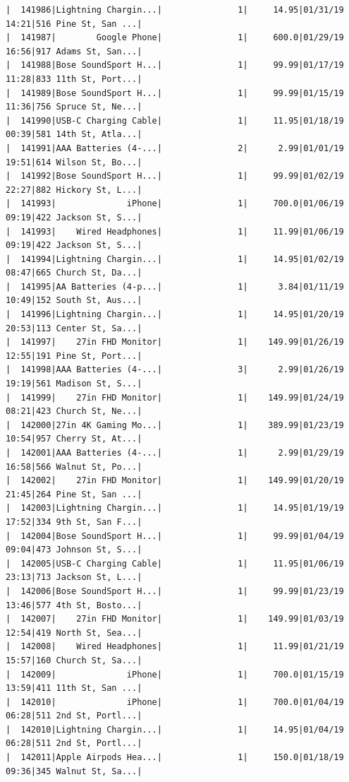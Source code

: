\documentclass[
  letterpaper,
  DIV=11,
  numbers=noendperiod]{scrartcl}
\begin{document}
\begin{verbatim}
|  141986|Lightning Chargin...|               1|     14.95|01/31/19 14:21|516 Pine St, San ...|
|  141987|        Google Phone|               1|     600.0|01/29/19 16:56|917 Adams St, San...|
|  141988|Bose SoundSport H...|               1|     99.99|01/17/19 11:28|833 11th St, Port...|
|  141989|Bose SoundSport H...|               1|     99.99|01/15/19 11:36|756 Spruce St, Ne...|
|  141990|USB-C Charging Cable|               1|     11.95|01/18/19 00:39|581 14th St, Atla...|
|  141991|AAA Batteries (4-...|               2|      2.99|01/01/19 19:51|614 Wilson St, Bo...|
|  141992|Bose SoundSport H...|               1|     99.99|01/02/19 22:27|882 Hickory St, L...|
|  141993|              iPhone|               1|     700.0|01/06/19 09:19|422 Jackson St, S...|
|  141993|    Wired Headphones|               1|     11.99|01/06/19 09:19|422 Jackson St, S...|
|  141994|Lightning Chargin...|               1|     14.95|01/02/19 08:47|665 Church St, Da...|
|  141995|AA Batteries (4-p...|               1|      3.84|01/11/19 10:49|152 South St, Aus...|
|  141996|Lightning Chargin...|               1|     14.95|01/20/19 20:53|113 Center St, Sa...|
|  141997|    27in FHD Monitor|               1|    149.99|01/26/19 12:55|191 Pine St, Port...|
|  141998|AAA Batteries (4-...|               3|      2.99|01/26/19 19:19|561 Madison St, S...|
|  141999|    27in FHD Monitor|               1|    149.99|01/24/19 08:21|423 Church St, Ne...|
|  142000|27in 4K Gaming Mo...|               1|    389.99|01/23/19 10:54|957 Cherry St, At...|
|  142001|AAA Batteries (4-...|               1|      2.99|01/29/19 16:58|566 Walnut St, Po...|
|  142002|    27in FHD Monitor|               1|    149.99|01/20/19 21:45|264 Pine St, San ...|
|  142003|Lightning Chargin...|               1|     14.95|01/19/19 17:52|334 9th St, San F...|
|  142004|Bose SoundSport H...|               1|     99.99|01/04/19 09:04|473 Johnson St, S...|
|  142005|USB-C Charging Cable|               1|     11.95|01/06/19 23:13|713 Jackson St, L...|
|  142006|Bose SoundSport H...|               1|     99.99|01/23/19 13:46|577 4th St, Bosto...|
|  142007|    27in FHD Monitor|               1|    149.99|01/03/19 12:54|419 North St, Sea...|
|  142008|    Wired Headphones|               1|     11.99|01/21/19 15:57|160 Church St, Sa...|
|  142009|              iPhone|               1|     700.0|01/15/19 13:59|411 11th St, San ...|
|  142010|              iPhone|               1|     700.0|01/04/19 06:28|511 2nd St, Portl...|
|  142010|Lightning Chargin...|               1|     14.95|01/04/19 06:28|511 2nd St, Portl...|
|  142011|Apple Airpods Hea...|               1|     150.0|01/18/19 09:36|345 Walnut St, Sa...|

\end{verbatim}
\end{document}

